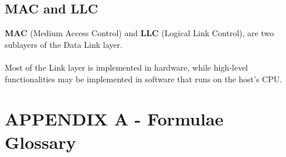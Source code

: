 \documentclass{article}
\begin{document}
\subsection{MAC and LLC}
\textbf{MAC} (Medium Access Control) and \textbf{LLC} (Logical Link Control), are two sublayers of the Data Link layer.\\ \\
Most of the Link layer is implemented in hardware, while high-level functionalities may be implemented in software that runs on the host's CPU.



\newpage

\section{APPENDIX A - Formulae Glossary}
\end{document}
